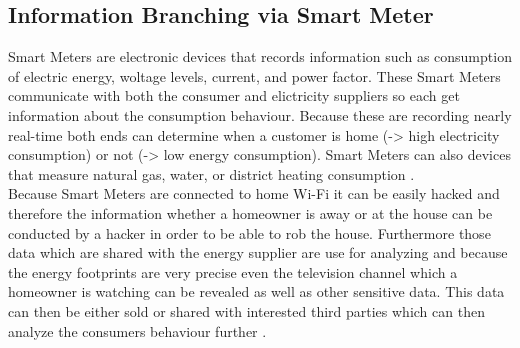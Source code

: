 \documentclass{report}
\begin{document}
		\subsection{Information Branching via Smart Meter}
		\startsubsection
			Smart Meters are electronic devices that records information such as consumption of electric energy, woltage levels, current, and power factor. These Smart Meters communicate with both the consumer and elictricity suppliers so each get information about the consumption behaviour. Because these are recording nearly real-time both ends can determine when a customer is home (-> high electricity consumption) or not (-> low energy consumption). Smart Meters can also devices that measure natural gas, water, or district heating consumption \cite{WSM}. \\
			Because Smart Meters are connected to home Wi-Fi it can be easily hacked and therefore the information whether a homeowner is away or at the house can be conducted by a hacker in order to be able to rob the house. Furthermore those data which are shared with the energy supplier are use for analyzing and because the energy footprints are very precise even the television channel which a homeowner is watching can be revealed as well as other sensitive data. This data can then be either sold or shared with interested third parties which can then analyze the consumers behaviour further \cite{PiP}.
		\closesection
\end{document}

